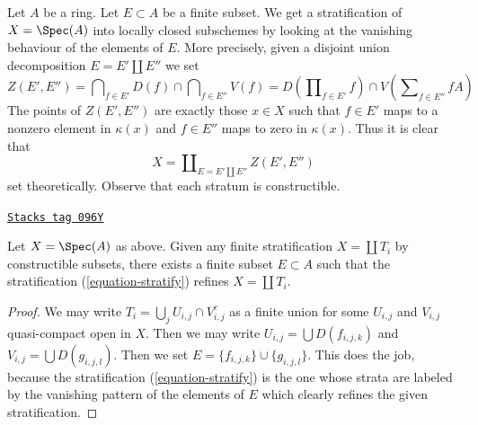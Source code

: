 Let $A$ be a ring. Let $E \subset A$ be a finite subset. We get a
stratification of $X = \Spec(A)$ into locally closed subschemes by
looking at the vanishing behaviour of the elements of $E$. More precisely,
given a disjoint union decomposition $E = E' \amalg E''$ we set
\begin{equation}
\label{equation-stratum}
Z(E', E'') =
\bigcap\nolimits_{f \in E'} D(f) \cap \bigcap\nolimits_{f \in E''} V(f) =
D(\prod\nolimits_{f \in E'} f) \cap V( \sum\nolimits_{f \in E''} fA)
\end{equation}
The points of $Z(E', E'')$ are exactly those $x \in X$ such that
$f \in E'$ maps to a nonzero element in $\kappa(x)$ and $f \in E''$
maps to zero in $\kappa(x)$. Thus it is clear that
\begin{equation}
\label{equation-stratify}
X = \coprod\nolimits_{E = E' \amalg E''} Z(E', E'')
\end{equation}
set theoretically. Observe that each stratum is constructible.

\begin{lemma}[Refine]
\label{proetale-lemma-refine}
\href{https://stacks.math.columbia.edu/tag/096Y}{\texttt{Stacks tag 096Y}}

Let $X = \Spec(A)$ as above. Given any finite stratification
$X = \coprod T_i$ by constructible subsets, there exists a finite
subset $E \subset A$ such that the stratification (\ref{equation-stratify})
refines $X = \coprod T_i$.
\end{lemma}

\begin{proof}
We may write $T_i = \bigcup_j U_{i, j} \cap V_{i, j}^c$ as a finite union
for some $U_{i, j}$ and $V_{i, j}$ quasi-compact open in $X$.
Then we may write $U_{i, j} = \bigcup D(f_{i, j, k})$ and
$V_{i, j} = \bigcup D(g_{i, j, l})$. Then we set
$E = \{f_{i, j, k}\} \cup \{g_{i, j, l}\}$. This does the job, because
the stratification (\ref{equation-stratify}) is the one whose strata are
labeled by the vanishing pattern of the elements of $E$ which
clearly refines the given stratification.
\end{proof}

